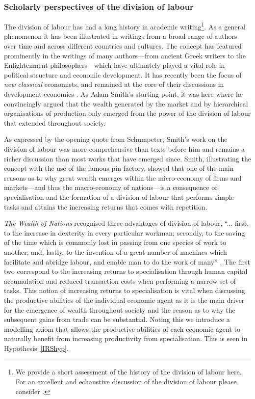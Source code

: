 \subsubsection{Scholarly perspectives of the division of labour}

The division of labour has had a long history in academic writing\footnote{We provide a short assessment of the history of the division of labour here. For an excellent and echaustive discussion of the division of labour please consider \citet{Sun2012}.}. As a general phenomenon it has been illustrated in writings from a broad range of authors over time and across different countries and cultures. The concept has featured prominently in the writings of many authors---from ancient Greek writers to the Enlightenment philosophers---which have ultimately played a vital role in political structure and economic development. It has recently been the focus of \emph{new classical} economists, and remained at the core of their discussions in development economics \citep{Yang2003}. As Adam Smith's starting point, it was here where he convincingly argued that the wealth generated by the market and by hierarchical organisations of production only emerged from the power of the division of labour that extended throughout society.

As expressed by the opening quote from Schumpeter, Smith's work on the division of labour was more comprehensive than texts before him and remains a richer discussion than most works that have emerged since. Smith, illustrating the concept with the use of the famous pin factory, showed that one of the main reasons as to why great wealth emerges within the micro-economy of firms and markets---and thus the macro-economy of nations---is a consequence of specialisation and the formation of a division of labour that performs simple tasks and attains the increasing returns that comes with repetition.

\emph{The Wealth of Nations} recognised three advantages of division of labour, ``... first, to the increase in dexterity in every particular workman; secondly, to the saving of the time which is commonly lost in passing from one species of work to another; and, lastly, to the invention of a great number of machines which facilitate and abridge labour, and enable man to do the work of many'' \citep[p.~7]{Smith1776}. The first two correspond to the increasing returns to specialisation through human capital accumulation and reduced transaction costs when performing a narrow set of tasks. This notion of increasing returns to specialisation is vital when discussing the productive abilities of the individual economic agent as it is the main driver for the emergence of wealth throughout society and the reason as to why the subsequent gains from trade can be substantial. Noting this we introduce a modelling axiom that allows the productive abilities of each economic agent to naturally benefit from increasing productivity from specialisation. This is seen in Hypothesis~\ref{IRShyp}.

